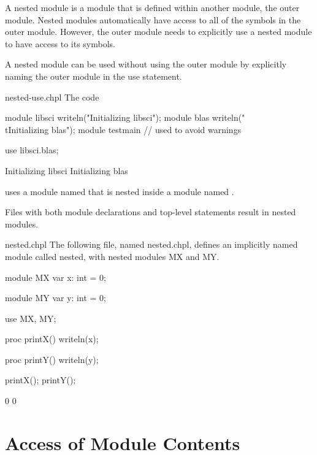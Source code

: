 A nested module is a module that is defined within another module, the
outer module.  Nested modules automatically have access to all of the
symbols in the outer module.  However, the outer module needs to
explicitly use a nested module to have access to its symbols.

A nested module can be used without using the outer module by
explicitly naming the outer module in the use statement.
\begin{chapelexample}{nested-use.chpl}
The code
\begin{chapelpre}
module libsci {
  writeln("Initializing libsci");
  module blas {
    writeln("\\tInitializing blas");
  }
}
module testmain { // used to avoid warnings
}
\end{chapelpre}
\begin{chapel}
use libsci.blas;
\end{chapel}
\begin{chapeloutput}
Initializing libsci
	Initializing blas
\end{chapeloutput}
uses a module named  that is nested inside a module
named .
\end{chapelexample}

Files with both module declarations and top-level statements result in
nested modules.

\begin{chapelexample}{nested.chpl}
The following file, named nested.chpl, defines an
implicitly named module called nested, with nested modules
MX and MY.
\begin{chapel}
module MX {
  var x: int = 0;
}

module MY {
  var y: int = 0;
}

use MX, MY;

proc printX() {
  writeln(x);
}

proc printY() {
  writeln(y);
}
\end{chapel}
\begin{chapelpost}
printX();
printY();
\end{chapelpost}
\begin{chapeloutput}
0
0
\end{chapeloutput}
\end{chapelexample}


\section{Access of Module Contents}
\label{Access_Of_Module_Contents}

